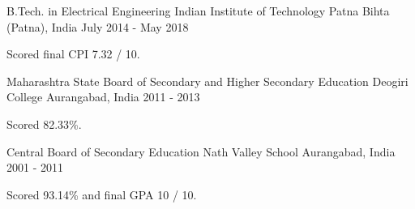 
\begin{cventries}

\cventry
	{B.Tech. in Electrical Engineering} %
	{Indian Institute of Technology Patna} %
	{Bihta (Patna), India} %
	{July 2014 - May 2018} %
	{\begin{cvitems} %
		\item {Scored final CPI 7.32 / 10.}
	\end{cvitems}}

\cventry
	{Maharashtra State Board of Secondary and Higher Secondary Education} %
	{Deogiri College} %
	{Aurangabad, India} %
	{2011 - 2013} %
	{\begin{cvitems} %
		\item {Scored 82.33\%.}
	\end{cvitems}}

\cventry
	{Central Board of Secondary Education} %
	{Nath Valley School} %
	{Aurangabad, India} %
	{2001 - 2011} %
	{\begin{cvitems} %
		\item {Scored 93.14\% and final GPA 10 / 10.}
	\end{cvitems}}

\end{cventries}
